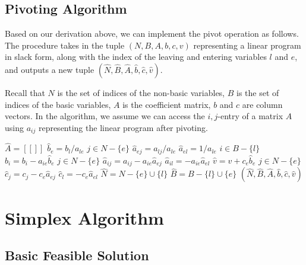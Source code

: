 \subsection{Pivoting Algorithm}

Based on our derivation above, we can implement the pivot operation as follows. The procedure  takes in the tuple $(N,B,A,b,c,v)$ representing a linear program in slack form, along with the index of the leaving and entering variables $l$ and $e$, and outputs a new tuple $(\hat{N},\hat{B},\hat{A},\hat{b},\hat{c},\hat{v})$.

Recall that $N$ is the set of indices of the non-basic variables, $B$ is the set of indices of the basic variables, $A$ is the coefficient matrix, $b$ and $c$ are column vectors. In the algorithm, we assume we can access the $i,j$-entry of a matrix $A$ using $a_{ij}$ representing the linear program after pivoting.

\begin{codebox}
    \li {}
    \li $\hat{A} = [[]]$
    \li {}
    \li $\hat{b}_e = b_l/a_{le}$
    \li \For $j \in N - \{e\}$ \Do
        \li $\hat{a}_{ej} = a_{lj}/a_{le}$
    \End
    \li $\hat{a}_{el} = 1/a_{le}$
    \li {}
    \li \For $i \in B - \{l\}$ \Do
        \li $\hat{b}_i = b_i - a_{ie} \hat{b}_e$
        \li \For $j \in N - \{e\}$ \Do
            \li $\hat{a}_{ij} = a_{ij} - a_{ie} \hat{a}_{ej}$
        \End
        \li $\hat{a}_{il} = -a_{ie} \hat{a}_{el}$
    \End
    \li {}
    \li $\hat{v} = v + c_e \hat{b}_e$
    \li \For $j \in N - \{e\}$ \Do
        \li $\hat{c}_j = c_j - c_e \hat{a}_{ej}$
    \End
    \li $\hat{c}_l = -c_e \hat{a}_{el}$
    \li {}
    \li $\hat{N} = N - \{e\} \cup \{l\}$
    \li $\hat{B} = B - \{l\} \cup \{e\}$ 
    \li \Return $(\hat{N},\hat{B},\hat{A},\hat{b},\hat{c},\hat{v})$ 
\end{codebox}

\section{Simplex Algorithm}

\subsection{Basic Feasible Solution}

